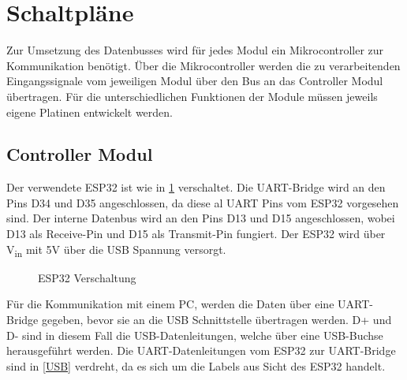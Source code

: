 \section{Schaltpläne}

Zur Umsetzung des Datenbusses wird für jedes Modul ein Mikrocontroller zur Kommunikation benötigt. 
Über die Mikrocontroller werden die zu verarbeitenden Eingangssignale vom jeweiligen Modul über den Bus an das Controller Modul übertragen. Für die 
unterschiedlichen Funktionen der Module müssen jeweils eigene Platinen entwickelt werden. 


\subsection{Controller Modul}
Der verwendete ESP32 ist wie in \ref{ESP} verschaltet. Die UART-Bridge wird an den Pins D34 und D35 angeschlossen, da diese al UART Pins vom ESP32 vorgesehen sind. Der interne Datenbus wird an den Pins D13 und D15 angeschlossen, wobei D13 als Receive-Pin und D15 als Transmit-Pin fungiert. Der ESP32 wird über V\textsubscript{in} mit 5V über die USB Spannung versorgt.

\begin{figure}[H]
    \centering    
    \caption{ESP32 Verschaltung}
    \label{ESP}
\end{figure}

Für die Kommunikation mit einem PC, werden die Daten über eine UART-Bridge gegeben, bevor sie an die USB Schnittstelle übertragen werden. D+ und D- sind in diesem Fall die USB-Datenleitungen, welche über eine USB-Buchse herausgeführt werden. Die UART-Datenleitungen vom ESP32 zur UART-Bridge sind in \ref{USB} verdreht, da es sich um die Labels aus Sicht des ESP32 handelt.


